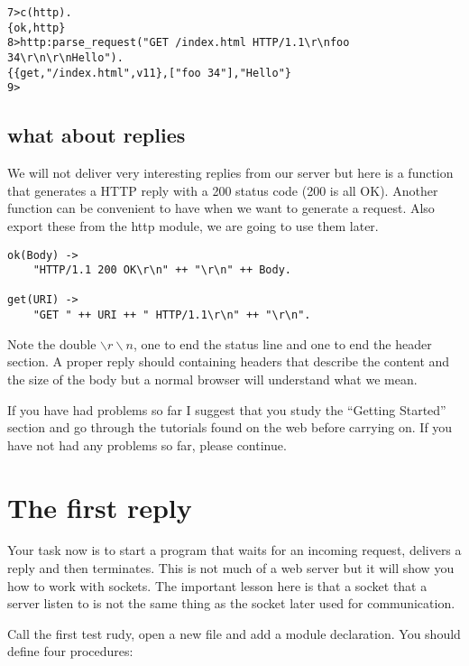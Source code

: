 \documentclass[a4paper, 11pt]{article}
\begin{document}
\begin{verbatim}
7>c(http).
{ok,http}
8>http:parse_request("GET /index.html HTTP/1.1\r\nfoo 34\r\n\r\nHello").
{{get,"/index.html",v11},["foo 34"],"Hello"}
9> 
\end{verbatim}

\subsection{what about replies}

We will not deliver very interesting replies from our server but here
is a function that generates a HTTP reply with a 200 status code (200
is all OK). Another function can be convenient to have when we want to
generate a request. Also export these from the http module, we are
going to use them later.

\begin{verbatim}
ok(Body) ->
    "HTTP/1.1 200 OK\r\n" ++ "\r\n" ++ Body.

get(URI) ->
    "GET " ++ URI ++ " HTTP/1.1\r\n" ++ "\r\n".
\end{verbatim}

Note the double {\tt $\backslash r\backslash n$}, one to end the
status line and one to end the header section. A proper reply should
containing headers that describe the content and the size of the body
but a normal browser will understand what we mean.

If you have had problems so far I suggest that you study the ``Getting
Started'' section and go through the tutorials found on the web before
carrying on. If you have not had any problems so far, please continue.

\section{The first reply}

Your task now is to start a program that waits for an incoming
request, delivers a reply and then terminates. This is not much of a
web server but it will show you how to work with sockets. The
important lesson here is that a socket that a server listen to is not
the same thing as the socket later used for communication. 

Call the first test rudy, open a new file and add a module
declaration. You should define four procedures:
\end{document}
